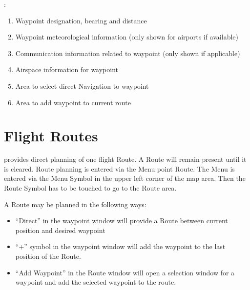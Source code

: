 \documentclass[letterpaper,10pt,english]{sphinxmanual}
\begin{document}
\sphinxAtStartPar
{}:
\begin{enumerate}
%
\item {} 
\sphinxAtStartPar
Waypoint designation, bearing and distance

\item {} 
\sphinxAtStartPar
Waypoint meteorological information (only shown for airports if available)

\item {} 
\sphinxAtStartPar
Communication information related to waypoint (only shown if applicable)

\item {} 
\sphinxAtStartPar
Airspace information for waypoint

\item {} 
\sphinxAtStartPar
Area to select direct Navigation to waypoint

\item {} 
\sphinxAtStartPar
Area to add waypoint to current route

\end{enumerate}


\section{Flight Routes}
\label{\detokenize{01-intro/further_steps:flight-routes}}
\sphinxAtStartPar
{} provides direct planning of one flight Route. A
Route will remain present until it is cleared.  Route planning is entered via
the Menu point Route. The Menu is entered via the Menu Symbol in the upper left
corner of the map area. Then the Route Symbol has to be touched to go to the
Route area.

\sphinxAtStartPar
A Route may be planned in the following ways:
\begin{itemize}
\item {} 
\sphinxAtStartPar
“Direct” in the waypoint window will provide a Route between current position and desired waypoint

\item {} 
\sphinxAtStartPar
“+” symbol in the waypoint window will add the waypoint to the last position of the Route.

\item {} 
\sphinxAtStartPar
“Add Waypoint” in the Route window will open a selection window for a waypoint and add the selected waypoint to the route.

\end{itemize}
\end{document}
